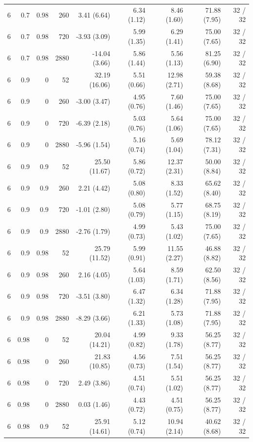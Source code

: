 \begin{longtable}{rrrrrrrrr}
6 & 0.7 & 0.98 & 260 & 3.41 (6.64) & 6.34 (1.12) & 8.46 (1.60) & 71.88 (7.95) & 32 / 32\\
6 & 0.7 & 0.98 & 720 & -3.93 (3.09) & 5.99 (1.35) & 6.29 (1.41) & 75.00 (7.65) & 32 / 32\\
6 & 0.7 & 0.98 & 2880 & -14.04 (3.66) & 5.86 (1.44) & 5.56 (1.13) & 81.25 (6.90) & 32 / 32\\
6 & 0.9 & 0 & 52 & 32.19 (16.06) & 5.51 (0.66) & 12.98 (2.71) & 59.38 (8.68) & 32 / 32\\
6 & 0.9 & 0 & 260 & -3.00 (3.47) & 4.95 (0.76) & 7.60 (1.46) & 75.00 (7.65) & 32 / 32\\
6 & 0.9 & 0 & 720 & -6.39 (2.18) & 5.03 (0.76) & 5.64 (1.06) & 75.00 (7.65) & 32 / 32\\
6 & 0.9 & 0 & 2880 & -5.96 (1.54) & 5.16 (0.74) & 5.69 (1.04) & 78.12 (7.31) & 32 / 32\\
6 & 0.9 & 0.9 & 52 & 25.50 (11.67) & 5.86 (0.72) & 12.37 (2.31) & 50.00 (8.84) & 32 / 32\\
6 & 0.9 & 0.9 & 260 & 2.21 (4.42) & 5.08 (0.80) & 8.33 (1.52) & 65.62 (8.40) & 32 / 32\\
6 & 0.9 & 0.9 & 720 & -1.01 (2.80) & 5.08 (0.79) & 5.77 (1.15) & 68.75 (8.19) & 32 / 32\\
6 & 0.9 & 0.9 & 2880 & -2.76 (1.79) & 4.99 (0.73) & 5.43 (1.02) & 75.00 (7.65) & 32 / 32\\
6 & 0.9 & 0.98 & 52 & 25.79 (11.52) & 5.99 (0.91) & 11.55 (2.27) & 46.88 (8.82) & 32 / 32\\
6 & 0.9 & 0.98 & 260 & 2.16 (4.05) & 5.64 (1.03) & 8.59 (1.71) & 62.50 (8.56) & 32 / 32\\
6 & 0.9 & 0.98 & 720 & -3.51 (3.80) & 6.47 (1.32) & 6.34 (1.28) & 71.88 (7.95) & 32 / 32\\
6 & 0.9 & 0.98 & 2880 & -8.29 (3.66) & 6.21 (1.33) & 5.73 (1.08) & 71.88 (7.95) & 32 / 32\\
6 & 0.98 & 0 & 52 & 20.04 (14.21) & 4.99 (0.82) & 9.33 (1.78) & 56.25 (8.77) & 32 / 32\\
6 & 0.98 & 0 & 260 & 21.83 (10.85) & 4.56 (0.73) & 7.51 (1.54) & 56.25 (8.77) & 32 / 32\\
6 & 0.98 & 0 & 720 & 2.49 (3.86) & 4.51 (0.74) & 5.51 (1.02) & 56.25 (8.77) & 32 / 32\\
6 & 0.98 & 0 & 2880 & 0.03 (1.46) & 4.43 (0.72) & 4.51 (0.75) & 56.25 (8.77) & 32 / 32\\
6 & 0.98 & 0.9 & 52 & 25.91 (14.61) & 5.12 (0.74) & 10.94 (2.14) & 40.62 (8.68) & 32 / 32\\

\end{longtable}
